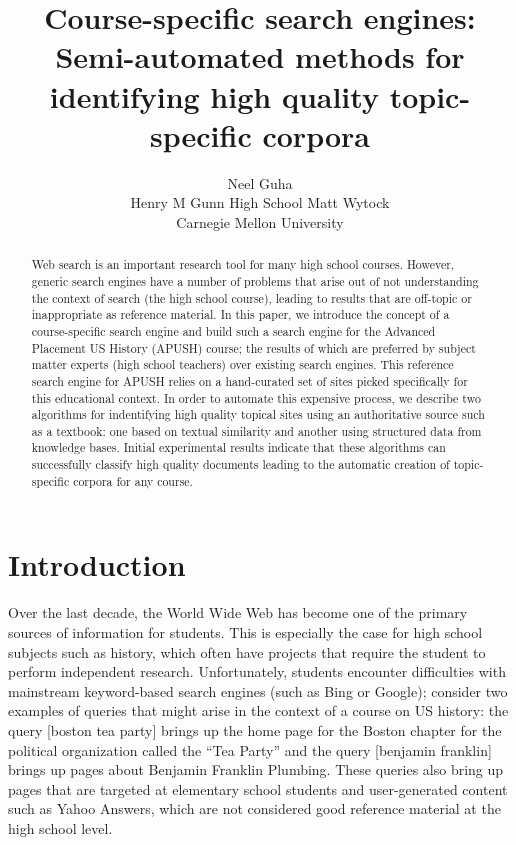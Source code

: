 \documentclass[pdfpagelabels=false,plainpages=true]{acm_proc_article-sp}
\begin{document}
\title{Course-specific search engines: Semi-automated methods for identifying
  high quality topic-specific corpora} 

\author{
  \alignauthor
  Neel Guha \\
Henry M Gunn High School
  \alignauthor
  Matt Wytock \\
Carnegie Mellon University
}

\maketitle
\begin{abstract}
Web search is an important research tool for many high school courses. However,
generic search engines have a number of problems that arise out of
not understanding the context of search (the high school course),
leading to results that are off-topic or inappropriate as reference material. In
this paper, we introduce the concept of a course-specific search 
engine and build such a search engine for the Advanced Placement US
History (APUSH) course; the results of which are preferred by subject matter experts (high
school teachers) over existing search
engines. This reference search engine for APUSH relies on a hand-curated set of
sites picked specifically for this educational context. In order to automate
this expensive process, we describe two algorithms for indentifying high quality
topical sites using an authoritative source such as a textbook: one based
on textual similarity and another using structured data from knowledge bases. 
Initial experimental results indicate that these algorithms can successfully
classify high quality documents leading to the automatic creation of
topic-specific corpora for any course.
\end{abstract}

\section{Introduction}

Over the last decade, the World Wide Web has become one of the primary sources
of information for students. This is especially the case for high school
subjects such as history, which often have projects that require the student to 
perform independent research. Unfortunately, students encounter difficulties
with mainstream keyword-based search engines (such as Bing or Google); 
consider two examples of queries that might arise in the context of a course
on US history: the query [boston tea party] brings up the home page for the
Boston chapter for the political organization called the ``Tea Party'' and the
query [benjamin franklin] brings up pages about Benjamin Franklin
Plumbing. These queries also bring up pages that are targeted at elementary
school students and user-generated content such as Yahoo Answers, which are not
considered good reference material at the high school level.
\end{document}
